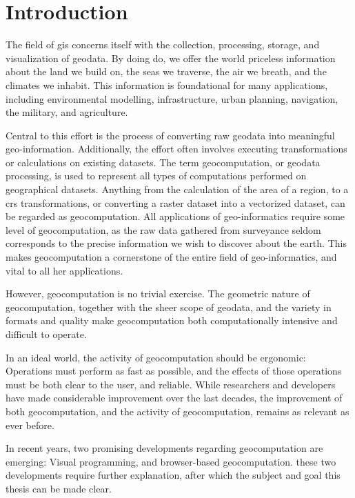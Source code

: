 \chapter{Introduction}


The field of \ac{gis} concerns itself with the collection, processing, storage, and visualization of geodata. 
By doing do, we offer the world priceless information about the land we build on, the seas we traverse, the air we breath, and the climates we inhabit. 
This information is foundational for many applications, including environmental modelling, infrastructure, urban planning, navigation, the military, and agriculture.   

Central to this effort is the process of converting raw geodata into meaningful geo-information. 
Additionally, the effort often involves executing transformations or calculations on existing datasets. 
The term \ac{geocomputation}, or geodata processing, is used to represent all types of computations performed on geographical datasets. Anything from the calculation of the area of a region, to a \ac{crs} transformations, or converting a raster dataset into a vectorized dataset, can be regarded as geocomputation.
All applications of geo-informatics require some level of geocomputation, as the raw data gathered from surveyance seldom corresponds to the precise information we wish to discover about the earth.       
This makes geocomputation a cornerstone of the entire field of geo-informatics, and vital to all her applications.

However, geocomputation is no trivial exercise. The geometric nature of geocomputation, together with the sheer scope of geodata, and the variety in formats and quality make geocomputation both computationally intensive and difficult to operate. 

In an ideal world, the activity of geocomputation should be ergonomic: Operations must perform as fast as possible, and the effects of those operations must be both clear to the user, and reliable.
While researchers and developers have made considerable improvement over the last decades, the improvement of both geocomputation, and the activity of geocomputation, remains as relevant as ever before. 

In recent years, two promising developments regarding geocomputation are emerging:
Visual programming, and browser-based geocomputation. 
these two developments require further explanation, after which the subject and goal this thesis can be made clear.

